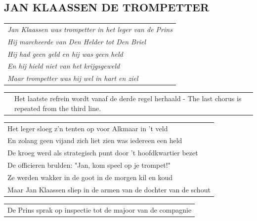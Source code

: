 \documentclass[a4paper, 14pt]{extarticle}
\begin{document}
\subsection*{JAN KLAASSEN DE TROMPETTER}
\begin{flushleft}
\begin{tabularx}{0.8\textwidth} {
   >{\raggedright\arraybackslash}X}
   \textit{Jan Klaassen was trompetter in het leger van de Prins}\\
\textit{Hij marcheerde van Den Helder tot Den Briel}\\
\textit{Hij had geen geld en hij was geen held}\\
\textit{En hij hield niet van het krijgsgeweld}\\
\textit{Maar trompetter was hij wel in hart en ziel}\\
\end{tabularx}
\end{flushleft}\begin{flushleft}
\begin{tabularx}{\textwidth} {
   c >{\raggedright\arraybackslash}X}
    \hspace{5mm} & {\small Het laatste refrein wordt vanaf de derde regel herhaald - The last chorus is repeated from the third line.}\\
\end{tabularx}
\end{flushleft}\begin{flushleft}
\begin{tabularx}{\textwidth} {
   >{\raggedright\arraybackslash}X}
Het leger sloeg z’n tenten op voor Alkmaar in ’t veld\\
En zolang geen vijand zich liet zien was iedereen een held\\
De kroeg werd als strategisch punt door ’t hoofdkwartier bezet\\
De officieren brulden: "Jan, kom speel op je trompet!"\\
Ze werden wakker in de goot in de morgen kil en koud\\
Maar Jan Klaassen sliep in de armen van de dochter van de schout\\
\end{tabularx}
\end{flushleft}\begin{flushleft}
\begin{tabularx}{\textwidth} {
   >{\raggedright\arraybackslash}X}
De Prins sprak op inspectie tot de majoor van de compagnie\\

\end{tabularx}
\end{flushleft}
\end{document}
